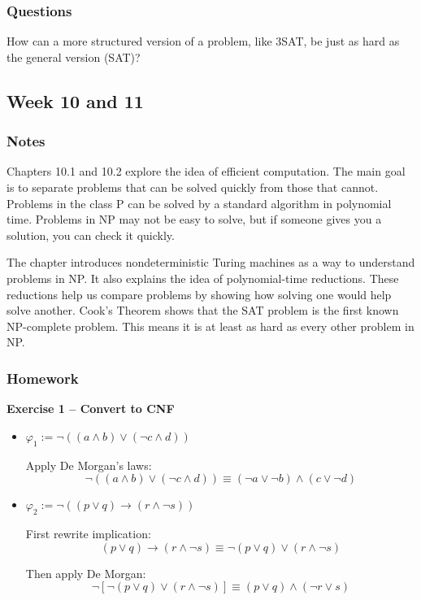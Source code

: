 \documentclass{article}
\theoremstyle{theorem}
\theoremstyle{definition}
\theoremstyle{remark}
\begin{document}
\subsubsection{Questions}

How can a more structured version of a problem, like 3SAT, be just as hard as the general version (SAT)?

\subsection{Week 10 and 11}

\subsubsection{Notes}

Chapters 10.1 and 10.2 explore the idea of efficient computation. The main goal is to separate problems that can be solved quickly from those that cannot. Problems in the class P can be solved by a standard algorithm in polynomial time. Problems in NP may not be easy to solve, but if someone gives you a solution, you can check it quickly.

The chapter introduces nondeterministic Turing machines as a way to understand problems in NP. It also explains the idea of polynomial-time reductions. These reductions help us compare problems by showing how solving one would help solve another. Cook’s Theorem shows that the SAT problem is the first known NP-complete problem. This means it is at least as hard as every other problem in NP.

\subsubsection{Homework}

\textbf{Exercise 1 – Convert to CNF}

\begin{itemize}
    \item \(\varphi_1 := \neg((a \land b) \lor (\neg c \land d))\)

    Apply De Morgan's laws:
    \[
    \neg((a \land b) \lor (\neg c \land d)) \equiv (\neg a \lor \neg b) \land (c \lor \neg d)
    \]

    \item \(\varphi_2 := \neg((p \lor q) \rightarrow (r \land \neg s))\)

    First rewrite implication:
    \[
    (p \lor q) \rightarrow (r \land \neg s) \equiv \neg(p \lor q) \lor (r \land \neg s)
    \]

    Then apply De Morgan:
    \[
    \neg[\neg(p \lor q) \lor (r \land \neg s)] \equiv (p \lor q) \land (\neg r \lor s)
    \]
\end{itemize}
\end{document}
